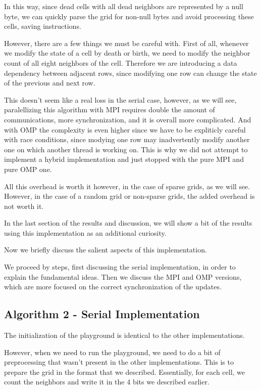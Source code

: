 \documentclass{report}
\begin{document}
In this way, since dead cells with all dead neighbors are represented by a null
byte, we can quickly parse the grid for non-null bytes and avoid processing 
these cells, saving instructions. 

However, there are a few things we must be careful with. First of all, whenever 
we modify the state of a cell by death or birth, we need to modify the neighbor 
count of all eight neighbors of the cell. Therefore we are introducing a data  
dependency between adjacent rows, since modifying one row can change the state 
of the previous and next row. 

This doesn't seem like a real loss in the serial case, however, as we will see, 
paralellizing this algorithm with MPI requires double the amount of 
communications, more synchronization, and it is overall more complicated. 
And with OMP the complexity is even higher since we have to be expliticly careful 
with race conditions, since modying one row may inadvertently modify another one 
on which another thread is working on. This is why we did not attempt to 
implement a hybrid implementation and just stopped with the pure MPI and pure 
OMP one. 

All this overhead is worth it however, in the case of sparse grids, as we will 
see. However, in the case of a random grid or non-sparse grids, the added 
overhead is not worth it. 

In the last section of the results and discussion, we will show a bit of the 
results using this implementation as an additional curiosity. 

Now we briefly discuss the salient aspects of this implementation. 

We proceed by steps, first discussing the serial implementation, in order to 
explain the fundamental ideas. Then we discuss the MPI and OMP versions, 
which are more focused on the correct synchronization of the updates. 

\subsection{Algorithm 2 - Serial Implementation}

The initialization of the playground is identical to the other implementations.

However, when we need to run the playground, we need to do a bit of preprocessing 
that wasn't present in the other implementations. This is to prepare the grid 
in the format that we described. Essentially, for each cell, we count the neighbors 
and write it in the 4 bits we described earlier.
\end{document}
